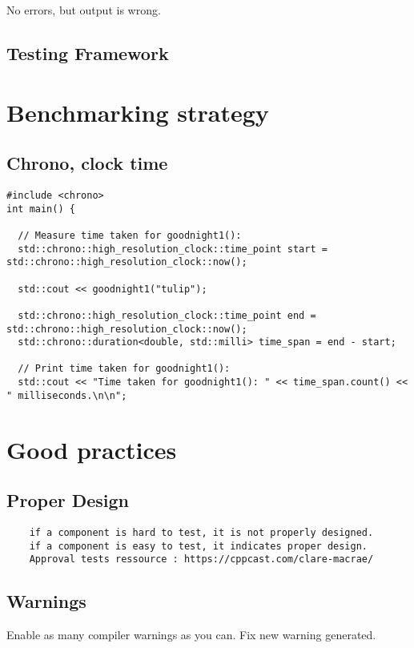 \documentclass[openany]{report}
\begin{document}
No errors, but output is wrong. 

\subsection{Testing Framework}

\section{Benchmarking strategy}
\subsection{Chrono, clock time}

\begin{verbatim}
#include <chrono>
int main() {

  // Measure time taken for goodnight1():
  std::chrono::high_resolution_clock::time_point start = std::chrono::high_resolution_clock::now();

  std::cout << goodnight1("tulip");

  std::chrono::high_resolution_clock::time_point end = std::chrono::high_resolution_clock::now();
  std::chrono::duration<double, std::milli> time_span = end - start;

  // Print time taken for goodnight1():
  std::cout << "Time taken for goodnight1(): " << time_span.count() << " milliseconds.\n\n";
\end{verbatim}

\section{Good practices}

\subsection{Proper Design}

\begin{verbatim}
    if a component is hard to test, it is not properly designed. 
    if a component is easy to test, it indicates proper design. 
    Approval tests ressource : https://cppcast.com/clare-macrae/ 
\end{verbatim}

\subsection{Warnings}

Enable as many compiler warnings as you can. 
Fix new warning generated. 
\end{document}
